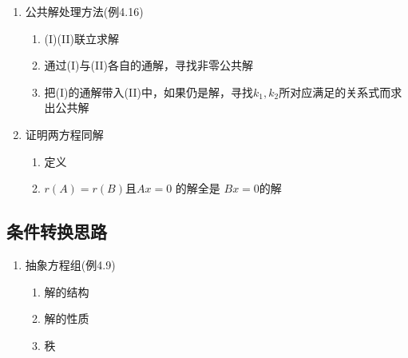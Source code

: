 \documentclass[a4paper,12pt]{article}
\begin{document}
\begin{enumerate}
\begin{enumerate}
            \item 对增广矩阵作初等{\color{red}{行变换}}化为阶梯形矩阵
            \item 求导出组的几个基础解系
            \item 求方程组的一个特解（为简捷，可令自由变量全为0）
            \item 按解的结构写出通解
            \item 注: \textbf{当方程组中含有参数时，分析讨论要严谨不要丢情况}
        \end{enumerate}
        \item 公共解处理方法(例4.16)
        \begin{enumerate}
            \item (I)(II)联立求解
            \item 通过(I)与(II)各自的通解，寻找非零公共解
            \item 把(I)的通解带入(II)中，如果仍是解，寻找$k_1, k_2$所对应满足的关系式而求出公共解
        \end{enumerate}
        \item 证明两方程同解
        \begin{enumerate}
            \item 定义
            \item $r(A) = r(B)$且$Ax = 0$ 的解全是 $Bx = 0$的解
        \end{enumerate}
    \end{enumerate}

    \subsection{条件转换思路}
    \begin{enumerate}
        \item 抽象方程组(例4.9)
        \begin{enumerate}
            \item 解的结构
            \item 解的性质
            \item 秩
        \end{enumerate}
    \end{enumerate}
\end{document}

